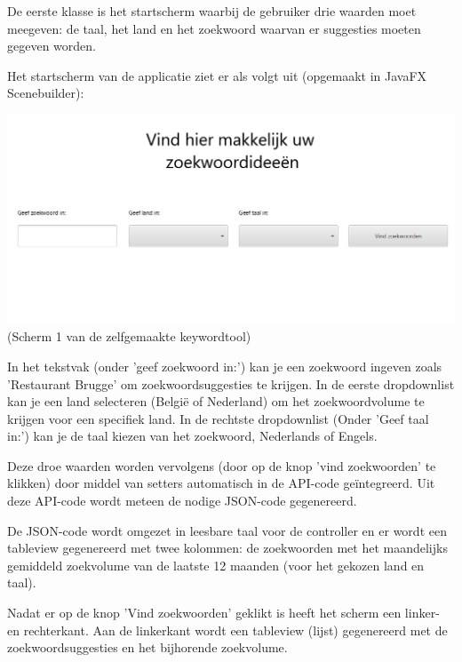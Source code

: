 De eerste klasse is het startscherm waarbij de gebruiker drie waarden moet meegeven: de taal, het land en het zoekwoord waarvan er suggesties moeten gegeven worden. 

Het startscherm van de applicatie ziet er als volgt uit (opgemaakt in JavaFX Scenebuilder): 

\includegraphics[width=\linewidth]{Bachelorproef/bachelor/img/keywordtoolscherm1.PNG}
(Scherm 1 van de zelfgemaakte keywordtool)

In het tekstvak (onder 'geef zoekwoord in:') kan je een zoekwoord ingeven zoals 'Restaurant Brugge' om zoekwoordsuggesties te krijgen. In de eerste dropdownlist kan je een land selecteren (België of Nederland) om het zoekwoordvolume te krijgen voor een specifiek land. In de rechtste dropdownlist (Onder 'Geef taal in:') kan je de taal kiezen van het zoekwoord, Nederlands of Engels. 

Deze droe waarden worden vervolgens (door op de knop 'vind zoekwoorden' te klikken) door middel van setters automatisch in de API-code geïntegreerd. Uit deze API-code wordt meteen de nodige JSON-code gegenereerd. 

De JSON-code wordt omgezet in leesbare taal voor de controller en er wordt een tableview gegenereerd met twee kolommen: de zoekwoorden met het maandelijks gemiddeld zoekvolume van de laatste 12 maanden (voor het gekozen land en taal). 

Nadat er op de knop 'Vind zoekwoorden' geklikt is heeft het scherm een linker- en rechterkant. Aan de linkerkant wordt een tableview (lijst) gegenereerd met de zoekwoordsuggesties en het bijhorende zoekvolume. 

